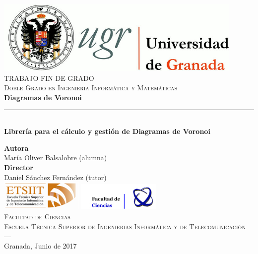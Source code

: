 \begin{titlepage}
 
 
\newlength{\centeroffset}
\setlength{\centeroffset}{-0.5\oddsidemargin}
\addtolength{\centeroffset}{0.5\evensidemargin}
\thispagestyle{empty}

\noindent\hspace*{\centeroffset}\begin{minipage}{\textwidth}

\centering
\includegraphics[width=0.9\textwidth]{imagenes/logo_ugr.jpg}\\[1.4cm]

\textsc{ \Large TRABAJO FIN DE GRADO\\[0.2cm]}
\textsc{ Doble Grado en Ingeniería Informática y Matemáticas}\\[1cm]
% 
{\Huge\bfseries Diagramas de Voronoi\\
}
\noindent\rule[-1ex]{\textwidth}{3pt}\\[3.5ex]
{\large\bfseries Librería para el cálculo y gestión de Diagramas de Voronoi}
\end{minipage}

\vspace{2cm}
\noindent\hspace*{\centeroffset}\begin{minipage}{\textwidth}
\centering

\textbf{Autora}\\ {María Oliver Balsalobre (alumna)}\\[2.5ex]
\textbf{Director}\\
{Daniel Sánchez Fernández (tutor)}\\[2cm]

\includegraphics[width=0.3\textwidth]{imagenes/etsiit_logo.png}
\includegraphics[width=0.3\textwidth]{imagenes/fciencias_logo.jpg}\\[1cm]
\textsc{Facultad de Ciencias \\ Escuela Técnica Superior de Ingenierías Informática y de Telecomunicación}\\
\textsc{---}\\
Granada, Junio de 2017
\end{minipage}
\end{titlepage}


